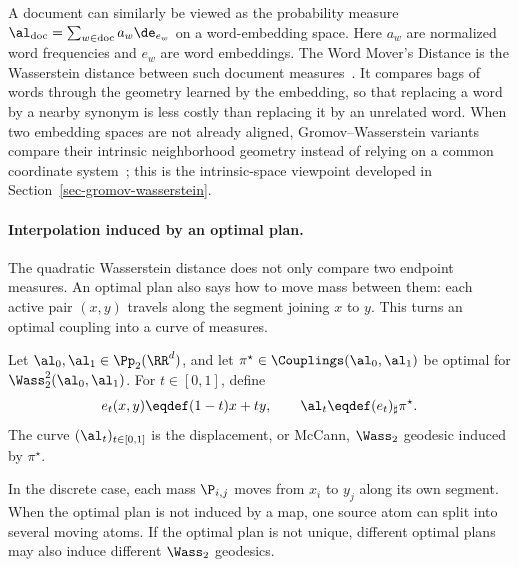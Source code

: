 \begin{example}\label{ex-word-mover-distance}
	A document can similarly be viewed as the probability measure
	$\al_{\mathrm{doc}}=\sum_{w\in\mathrm{doc}}a_w\de_{e_w}$ on a word-embedding space.
	Here \(a_w\) are normalized word frequencies and \(e_w\) are word embeddings. The Word Mover's Distance is the Wasserstein distance between such document measures~\cite{kusner2015word}. It compares bags of words through the geometry learned by the embedding, so that replacing a word by a nearby synonym is less costly than replacing it by an unrelated word. When two embedding spaces are not already aligned, Gromov--Wasserstein variants compare their intrinsic neighborhood geometry instead of relying on a common coordinate system~\cite{alvarez2018towards}; this is the intrinsic-space viewpoint developed in Section~\ref{sec-gromov-wasserstein}.
\end{example}

\paragraph{Interpolation induced by an optimal plan.}
\label{sec-kantorovich-plan-interpolation}

The quadratic Wasserstein distance does not only compare two endpoint measures. An optimal plan also says how to move mass between them: each active pair $(x,y)$ travels along the segment joining $x$ to $y$. This turns an optimal coupling into a curve of measures.

\begin{defn}\label{def-w2-geodesic-induced-by-plan}
	Let $\al_0,\al_1\in\Pp_2(\RR^d)$, and let $\pi^\star\in\Couplings(\al_0,\al_1)$ be optimal for $\Wass_2^2(\al_0,\al_1)$. For $t\in[0,1]$, define
	\[
		e_t(x,y)\eqdef(1-t)x+t y,
		\qquad
		\al_t\eqdef(e_t)_\sharp\pi^\star.
	\]
	The curve $(\al_t)_{t\in[0,1]}$ is the displacement, or McCann, $\Wass_2$ geodesic induced by $\pi^\star$.
\end{defn}
In the discrete case, each mass $\P_{i,j}$ moves from $x_i$ to $y_j$ along its own segment. When the optimal plan is not induced by a map, one source atom can split into several moving atoms. If the optimal plan is not unique, different optimal plans may also induce different $\Wass_2$ geodesics.

